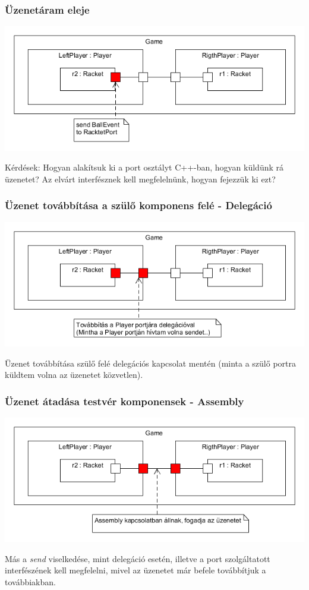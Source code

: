 \documentclass[11pt]{beamer}
\begin{document}
\begin{frame}
	\frametitle{Üzenetáram eleje}
	\includegraphics[scale=0.5]{vedes_demo_send.png}
	
	Kérdések: Hogyan alakítsuk ki a port osztályt C++-ban, hogyan küldünk rá üzenetet? Az elvárt interfésznek kell megfelelnünk, hogyan fejezzük ki ezt?
	
\end{frame}

\begin{frame}
	\frametitle{Üzenet továbbítása a szülő komponens felé - Delegáció}
	\begin{center}
	\includegraphics[scale=0.5]{vedes_demo_connect.png}
	\end{center}
	
	Üzenet továbbítása szülő felé delegációs kapcsolat mentén (minta a szülő portra küldtem volna az üzenetet közvetlen).

\end{frame}


\begin{frame}
	\frametitle{Üzenet átadása testvér komponensek - Assembly}
	\begin{center}
	\includegraphics[scale=0.5]{vedes_demo_assconnect.png}
	\end{center}
	 Más a \textit{send} viselkedése, mint delegáció esetén, illetve a port szolgáltatott interfészének kell megfelelni, mivel az üzenetet már befele továbbítjuk a továbbiakban.
		
\end{frame}
\end{document}
